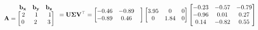 \documentclass[preview]{standalone}
\begin{document}
\begin{align*}
\begin{array}{ccc}\begin{matrix}\hspace{0.75cm} \mathbf{b_{x}} &  \mathbf{b_{y}} &  \mathbf{b_{z}} \end{matrix} \\ \mathbf{A} = \begin{bmatrix} 2 & \hspace{0.1cm} 1 \hspace{0.1cm}& \hspace{0.1cm} 1 \\ \hspace{0.04cm}  0 \hspace{0.1cm} & \hspace{0.1cm} 2 \hspace{0.1cm}\hspace{0.1cm} & 3 \end{bmatrix} \end{array}= \mathbf{U \Sigma V^\top}= \begin{bmatrix} -0.46 & -0.89 & \\ -0.89 & 0.46 \end{bmatrix} \begin{bmatrix} 3.95 & 0 & 0 \\0 & 1.84 & 0 \end{bmatrix}\begin{bmatrix} -0.23 & -0.57 & -0.79 \\-0.96 & 0.01 & 0.27 \\ 0.14 & -0.82 & 0.55 \end{bmatrix}
\end{align*}
\end{document}
